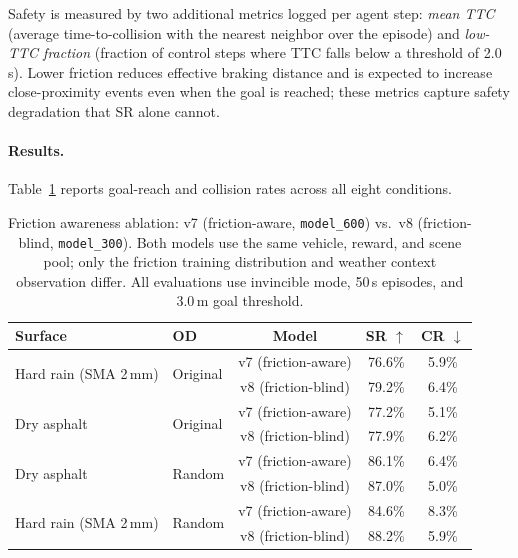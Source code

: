 Safety is measured by two additional metrics logged per agent step: \emph{mean TTC} (average time-to-collision with the nearest neighbor over the episode) and \emph{low-TTC fraction} (fraction of control steps where TTC falls below a threshold of 2.0\,s).
Lower friction reduces effective braking distance and is expected to increase close-proximity events even when the goal is reached; these metrics capture safety degradation that SR alone cannot.

\paragraph{Results.}
Table~\ref{tab:friction_ablation} reports goal-reach and collision rates across all eight conditions.

\begin{table}[t]
\centering
\caption{Friction awareness ablation: v7 (friction-aware, \texttt{model\_600}) vs.\ v8 (friction-blind, \texttt{model\_300}).
Both models use the same vehicle, reward, and scene pool; only the friction training distribution and weather context observation differ.
All evaluations use invincible mode, 50\,s episodes, and 3.0\,m goal threshold.}
\label{tab:friction_ablation}
\small
\begin{tabular}{llccc}
\toprule
Surface & OD & Model & SR $\uparrow$ & CR $\downarrow$ \\
\midrule
\multirow{2}{*}{Hard rain (SMA 2\,mm)} & \multirow{2}{*}{Original}
  & v7 (friction-aware) & 76.6\% & 5.9\% \\
& & v8 (friction-blind)  & 79.2\% & 6.4\% \\
\midrule
\multirow{2}{*}{Dry asphalt} & \multirow{2}{*}{Original}
  & v7 (friction-aware) & 77.2\% & 5.1\% \\
& & v8 (friction-blind)  & 77.9\% & 6.2\% \\
\midrule
\multirow{2}{*}{Dry asphalt} & \multirow{2}{*}{Random}
  & v7 (friction-aware) & 86.1\% & 6.4\% \\
& & v8 (friction-blind)  & 87.0\% & 5.0\% \\
\midrule
\multirow{2}{*}{Hard rain (SMA 2\,mm)} & \multirow{2}{*}{Random}
  & v7 (friction-aware) & 84.6\% & 8.3\% \\
& & v8 (friction-blind)  & 88.2\% & 5.9\% \\
\bottomrule
\end{tabular}
\end{table}

